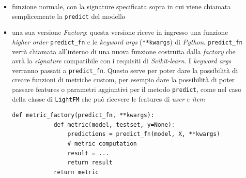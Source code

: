 \begin{itemize}
    \item funzione normale, con la signature specificata sopra in cui viene chiamata semplicemente la \texttt{predict} del modello
    \item una sua versione \textit{Factory}: questa versione riceve in ingresso una funzione \textit{higher order} \texttt{predict\_fn} e le \textit{keyword args} (\texttt{**kwargs}) di \textit{Python}. \texttt{predict\_fn} verrà chiamata all'interno di una nuova funzione costruita dalla \textit{factory} che avrà la \textit{signature} compatibile con i requisiti di \textit{Scikit-learn}. I \textit{keyword args} verranno passati a \texttt{predict\_fn}. Questo serve per poter dare la possibilità di creare funzioni di metriche custom, per esempio dare la possibilità di poter passare features o parametri aggiuntivi per il metodo \texttt{predict}, come nel caso della classe di \texttt{LightFM} che può ricevere le features di \textit{user} e \textit{item}
    \begin{lstlisting}[caption=Implementazione in pseudo codice di una \textit{factory} per una metrica generica ]
        def metric_factory(predict_fn, **kwargs):
            def metric(model, testset, y=None):
                predictions = predict_fn(model, X, **kwargs)
                # metric computation
                result = ...
                return result
            return metric
    \end{lstlisting}
\end{itemize}